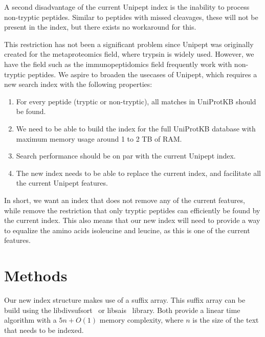 \documentclass[10pt]{article}
\begin{document}
\begin{multicols}{2}
        A second disadvantage of the current Unipept index is the inability to process non-tryptic peptides.
        Similar to peptides with missed cleavages, these will not be present in the index, but there exists no workaround for this.

        This restriction has not been a significant problem since Unipept was originally created for the metaproteomics field, where trypsin is widely used.
        However, we have the field such as the immunopeptidomics field frequently work with non-tryptic peptides.
        We aspire to broaden the usecases of Unipept, which requires a new search index with the following properties:

        \begin{enumerate}
            \item For every peptide (tryptic or non-tryptic), all matches in UniProtKB should be found.
            \item We need to be able to build the index for the full UniProtKB database with maximum memory usage around 1 to 2 TB of RAM\@.
            \item Search performance should be on par with the current Unipept index.
            \item The new index needs to be able to replace the current index, and facilitate all the current Unipept features.
        \end{enumerate}

        In short, we want an index that does not remove any of the current features, while remove the restriction that only tryptic peptides can efficiently be found by the current index.
        This also means that our new index will need to provide a way to equalize the amino acids isoleucine and leucine, as this is one of the current features.

        \section{Methods}\label{sec:methods}
        Our new index structure makes use of a suffix array.
        This suffix array can be build using the libdivsufsort~\cite{libdivsufsort} or libsais~\cite{libsais} library.
        Both provide a linear time algorithm with a $5n + O(1)$ memory complexity, where $n$ is the size of the text that needs to be indexed.


\end{multicols}
\end{document}
